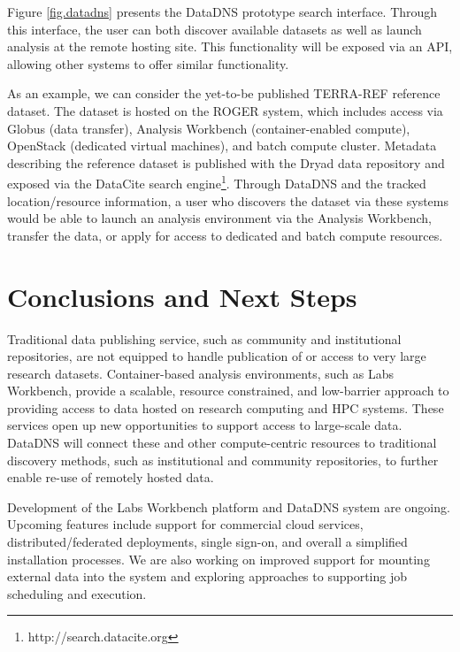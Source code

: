 \documentclass{sig-alternate}
\begin{document}
Figure \ref{fig.datadns} presents the DataDNS prototype search interface. Through this interface, the user can both discover available datasets as well as launch analysis at the remote hosting site. This functionality will be exposed via an API, allowing other systems to offer similar functionality.

As an example, we can consider the yet-to-be published TERRA-REF reference dataset. The dataset is hosted on the ROGER system, which includes access via Globus (data transfer), Analysis Workbench (container-enabled compute), OpenStack (dedicated virtual machines), and batch compute cluster.  Metadata describing the reference dataset is published with the Dryad data repository and exposed via the DataCite search engine\footnote{http://search.datacite.org}. Through DataDNS and the tracked location/resource information, a user who discovers the dataset via these systems would be able to launch an analysis environment via the Analysis Workbench, transfer the data, or apply for access to dedicated and batch compute resources.


\section{Conclusions and Next Steps}

Traditional data publishing service, such as community and institutional repositories, are not equipped to handle publication of or access to very large research datasets.  Container-based analysis environments, such as Labs Workbench, provide a scalable, resource constrained, and low-barrier approach to providing access to data hosted on research computing and HPC systems. These services open up  new opportunities to support access to large-scale data.  DataDNS will connect these and other compute-centric resources to traditional discovery methods, such as institutional and community repositories, to further enable re-use of remotely hosted data.

Development of the Labs Workbench platform and DataDNS system are ongoing.  Upcoming features include support for commercial cloud services, distributed/federated deployments, single sign-on, and overall a simplified installation processes. We are also working on improved support for mounting external data into the system and exploring approaches to supporting job scheduling and execution.


\small
  
\end{document}
